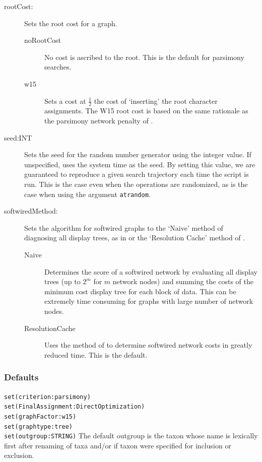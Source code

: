 \begin{description}
		\item[rootCost:] Sets the root cost for a graph. 			
			\begin{description}
			\item[noRootCost]  No cost is ascribed to the root.  This is the default for parsimony searches.
			
			\item[w15]  Sets a cost at $\frac{1}{2}$ the cost of `inserting' the root character 
			assignments. The W15 root cost is based on the same rationale as the parsimony 
			network penalty of  \cite{Wheeler2015}. 

			
			\end{description}
			 
		 \item[seed:INT] Sets the seed for the random number generator using the integer
		 value. If unspecified, \phyg uses the system time as the seed. By setting this value, 
		 we are guaranteed to reproduce a given search trajectory each time the script is run. 
		 This is the case even when the operations are randomized, as is the case when using 
		 the argument \texttt{atrandom}.
			 
		 \item[softwiredMethod:] Sets the algorithm for softwired graphs to the 
		 `Naive' method of diagnosing all display trees, as in \cite{Wheeler2015} or
		 the `Resolution Cache' method of \cite{WheelerandWashburn2023}.
		 
				
			\begin{description}
			\item[Naive] Determines the score of a softwired network by evaluating all display trees
			(up to $2^m$ for $m$ network nodes) and summing the costs of the minimum cost display tree for each block
			of data.  This can be extremely time consuming for graphs with large number of network nodes.
			
			\item[ResolutionCache] Uses the method of \citep{WheelerandWashburn2023} to determine
			softwired network costs in greatly reduced time.  This is the default.
			
			
			\end{description}
			
		\end{description}
					
	\subsubsection{Defaults} 
		\texttt{set(criterion:parsimony)}\\
		\texttt{set(FinalAssignment:DirectOptimization)} \\
		\texttt{set(graphFactor:w15)} \\
		\texttt{set(graphtype:tree)}\\
		\texttt{set(outgroup:STRING)} The default outgroup is the taxon whose name is 
		lexically first after renaming of taxa and/or if taxon were specified for inclusion or
		exclusion. 
		
